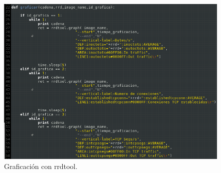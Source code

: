 \FloatBarrier
\begin{figure}[htbp!]
		\centering
			\includegraphics[width=.9 \textwidth]{images/graficar8}
		\caption{Graficación con rrdtool.}
		\label{image:graficar8}
\end{figure}
\FloatBarrier

